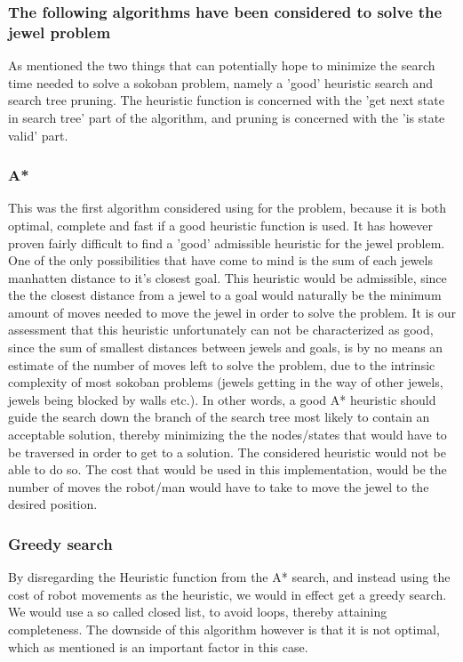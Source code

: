 \subsubsection*{The following algorithms have been considered to solve the jewel problem}
As mentioned the two things that can potentially hope to minimize the search time needed to solve a sokoban problem, namely a 'good' heuristic search and search tree pruning. The heuristic function is concerned with the 'get next state in search tree' part of the algorithm, and pruning is concerned with the 'is state valid' part.

\subsubsection*{A*}
This was the first algorithm considered using for the problem, because it is both optimal, complete and fast if a good heuristic function is used.
It has however proven fairly difficult to find a 'good' admissible heuristic for the jewel problem. One of the only possibilities that have come to mind is the sum of each jewels manhatten distance to it's closest goal. This heuristic would be admissible, since the the closest distance from a jewel to a goal would naturally be the minimum amount of moves needed to move the jewel in order to solve the problem. It is our assessment that this heuristic unfortunately can not be characterized as good, since the sum of smallest distances between jewels and goals, is by no means an estimate of the number of moves left to solve the problem, due to the intrinsic complexity of most sokoban problems (jewels getting in the way of other jewels, jewels being blocked by walls etc.). In other words, a good A* heuristic should guide the search down the branch of the search tree most likely to contain an acceptable solution, thereby minimizing the the nodes/states that would have to be traversed in order to get to a solution. The considered heuristic would not be able to do so.
The cost that would be used in this implementation, would be the number of moves the robot/man would have to take to move the jewel to the desired position.

\subsubsection*{Greedy search}
By disregarding the Heuristic function from the A* search, and instead using the cost of robot movements as the heuristic, we would in effect get a greedy search. We would use a so called closed list, to avoid loops, thereby attaining completeness. The downside of this algorithm however is that it is not optimal, which as mentioned is an important factor in this case.

